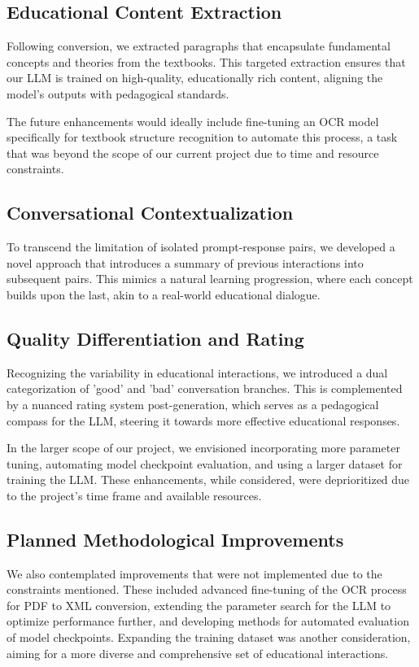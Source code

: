 \documentclass[]{article}
\begin{document}
\subsection{Educational Content Extraction}
Following conversion, we extracted paragraphs that encapsulate fundamental concepts and theories from the textbooks. This targeted extraction ensures that our LLM is trained on high-quality, educationally rich content, aligning the model's outputs with pedagogical standards.

The future enhancements would ideally include fine-tuning an OCR model specifically for textbook structure recognition to automate this process, a task that was beyond the scope of our current project due to time and resource constraints.

\subsection{Conversational Contextualization}
To transcend the limitation of isolated prompt-response pairs, we developed a novel approach that introduces a summary of previous interactions into subsequent pairs. This mimics a natural learning progression, where each concept builds upon the last, akin to a real-world educational dialogue.

\subsection{Quality Differentiation and Rating}
Recognizing the variability in educational interactions, we introduced a dual categorization of 'good' and 'bad' conversation branches. This is complemented by a nuanced rating system post-generation, which serves as a pedagogical compass for the LLM, steering it towards more effective educational responses.

In the larger scope of our project, we envisioned incorporating more parameter tuning, automating model checkpoint evaluation, and using a larger dataset for training the LLM. These enhancements, while considered, were deprioritized due to the project's time frame and available resources.

\subsection{Planned Methodological Improvements}
We also contemplated improvements that were not implemented due to the constraints mentioned. These included advanced fine-tuning of the OCR process for PDF to XML conversion, extending the parameter search for the LLM to optimize performance further, and developing methods for automated evaluation of model checkpoints. Expanding the training dataset was another consideration, aiming for a more diverse and comprehensive set of educational interactions.
\end{document}
